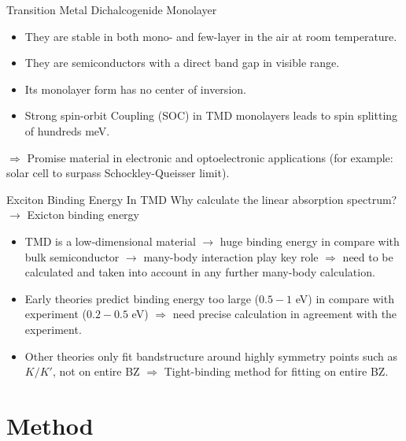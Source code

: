 \documentclass{beamer}
\begin{document}
	\begin{frame}{Transition Metal Dichalcogenide Monolayer}
		\begin{itemize}
			\item They are stable in both mono- and few-layer in the air at room temperature. \\
			\item They are semiconductors with a direct band gap in visible range.
			\item Its monolayer form has no center of inversion.\\
			\item Strong spin-orbit Coupling (SOC) in TMD monolayers leads to spin splitting of hundreds meV.
		\end{itemize}
		$\Rightarrow$ Promise material in electronic and optoelectronic applications (for example: solar cell to surpass Schockley-Queisser limit).
	\end{frame}
	\begin{frame}{Exciton Binding Energy In TMD}
		Why calculate the linear absorption spectrum?\\ $\to$ Exicton binding energy
		\begin{itemize}
			\item TMD is a low-dimensional material $\to$ huge binding energy in compare with bulk semiconductor $\to$ many-body interaction play key role $\Rightarrow$ need to be calculated and taken into account in any further many-body calculation.
			\item Early theories predict binding energy too large ($0.5-1$ eV) in compare with experiment ($0.2-0.5$ eV) $\Rightarrow$ need precise calculation in agreement with the experiment.
			\item Other theories only fit bandstructure around highly symmetry points such as $K/K'$, not on entire BZ $\Rightarrow$ Tight-binding method for fitting on entire BZ.
		\end{itemize}
	\end{frame}
	\section{Method}
\end{document}
